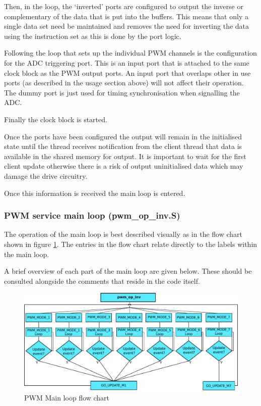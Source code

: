 Then, in the loop, the `inverted' ports are configured to output the inverse or complementary of the data that is put into the buffers. This means that only a single data set need be maintained and removes the need for inverting the data using the instruction set as this is done by the port logic.

Following the loop that sets up the individual PWM channels is the configuration for the ADC triggering port. This is an input port that is attached to the same clock block as the PWM output ports. An input port that overlaps other in use ports (as described in the usage section above) will not affect their operation. The dummy port is just used for timing synchronisation when signalling the ADC.

Finally the clock block is started.

Once the ports have been configured the output will remain in the initialised state until the thread receives notification from the client thread that data is available in the shared memory for output. It is important to wait for the first client update otherwise there is a risk of output uninitialised data which may damage the drive circuitry.

Once this information is received the main loop is entered.

\subsubsection{PWM service main loop (pwm\_op\_inv.S)}
The operation of the main loop is best described visually as in the flow chart shown in figure \ref{fig_PwmMainLoopFlow}. The entries in the flow chart relate directly to the labels within the main loop. 

A brief overview of each part of the main loop are given below. These should be consulted alongside the comments that reside in the code itself.

\begin{figure}[p]
\begin{center}
\includegraphics[width=0.9\textheight, angle=90]{images/pwm_loop.pdf}
\caption{PWM Main loop flow chart}
\label{fig_PwmMainLoopFlow}
\end{center}
\end{figure}

